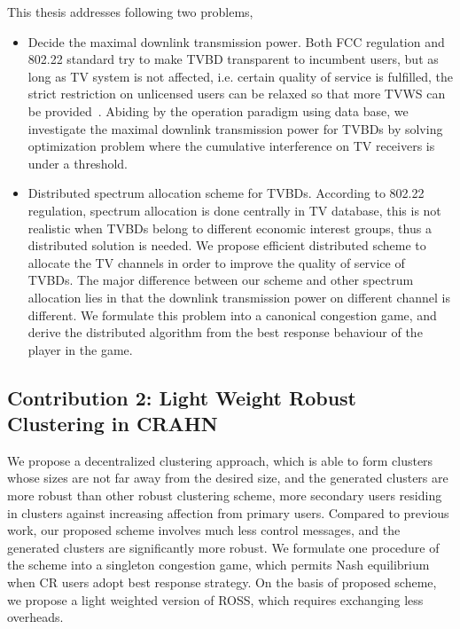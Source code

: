 This thesis addresses following two problems,
\begin{itemize}
\item Decide the maximal downlink transmission power.
Both FCC regulation and 802.22 standard try to make TVBD transparent to incumbent users, but as long as TV system is not affected, i.e. certain quality of service is fulfilled, the strict restriction on unlicensed users can be relaxed so that more TVWS can be provided~\cite{multipleIntf_pimrc11}. 
Abiding by the operation paradigm using data base, we investigate the maximal downlink transmission power for TVBDs by solving optimization problem where the cumulative interference on TV receivers is under a threshold.

\item Distributed spectrum allocation scheme for TVBDs.
According to 802.22 regulation, spectrum allocation is done centrally in TV database, this is not realistic when TVBDs belong to different economic interest groups, thus a distributed solution is needed.
We propose efficient distributed scheme to allocate the TV channels in order to improve the quality of service of TVBDs.
The major difference between our scheme and other spectrum allocation lies in that the downlink transmission power on different channel is different.
We formulate this problem into a canonical congestion game, and derive the distributed algorithm from the best response behaviour of the player in the game. 
\end{itemize}





\subsection*{Contribution 2: Light Weight Robust Clustering in CRAHN}
We propose a decentralized clustering approach, which is able to form clusters whose sizes are not far away from the desired size, and the generated clusters are more robust than other robust clustering scheme, \ie more secondary users residing in clusters against increasing affection from primary users.
Compared to previous work, our proposed scheme involves much less control messages, and the generated clusters are significantly more robust.
We formulate one procedure of the scheme into a singleton congestion game, which permits Nash equilibrium when CR users adopt  best response strategy. 
On the basis of proposed scheme, we propose a light weighted version of ROSS, which requires exchanging less overheads.







